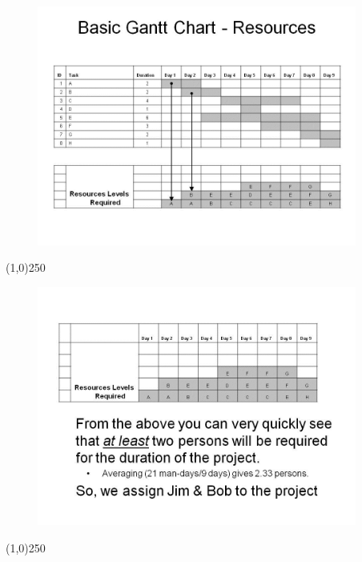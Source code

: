 \begin{frame}
\begin{figure}
	\centering
		\includegraphics[width = 10.5cm]{oldnotes/Slide35.jpg}
\end{figure}
\end{frame}
\begin{center}\line(1,0){250}\end{center}





\begin{frame}
\begin{figure}
	\centering
		\includegraphics[width = 10.5cm]{oldnotes/Slide36.jpg}
\end{figure}
\end{frame}
\begin{center}\line(1,0){250}\end{center}






